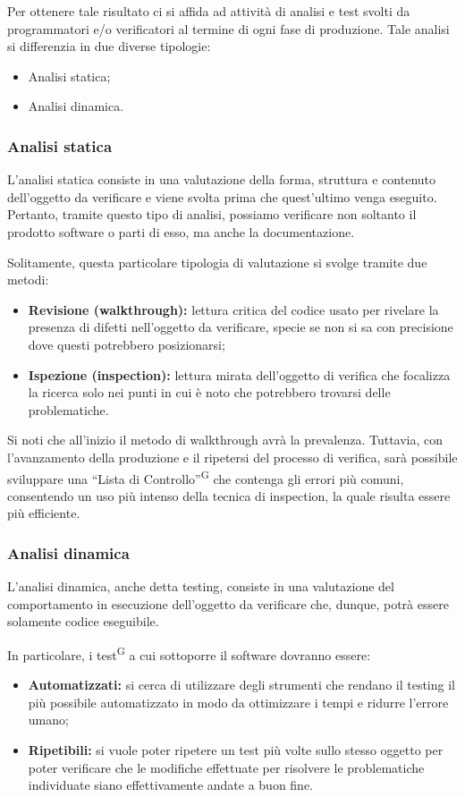 Per ottenere tale risultato ci si affida ad attività di analisi e test svolti da programmatori e/o verificatori al termine di ogni fase di produzione. Tale analisi si differenzia in due diverse tipologie:
\begin{itemize}
    \item Analisi statica;
    \item Analisi dinamica.
\end{itemize}

\subsubsection{Analisi statica}
L'analisi statica consiste in una valutazione della forma, struttura e contenuto dell'oggetto da verificare e viene svolta prima che quest'ultimo venga eseguito. Pertanto, tramite questo tipo di analisi, possiamo verificare non soltanto il prodotto software o parti di esso, ma anche la documentazione.

Solitamente, questa particolare tipologia di valutazione si svolge tramite due metodi:
\begin{itemize}
    \item \textbf{Revisione (walkthrough):} lettura critica del codice usato per rivelare la presenza di difetti nell'oggetto da verificare, specie se non si sa con precisione dove questi potrebbero posizionarsi;
    \item \textbf{Ispezione (inspection):} lettura mirata dell’oggetto di verifica che focalizza la ricerca solo nei punti in cui è noto che potrebbero trovarsi delle problematiche.
\end{itemize}
Si noti che all'inizio il metodo di walkthrough avrà la prevalenza. Tuttavia, con l'avanzamento della produzione e il ripetersi del processo di verifica, sarà possibile sviluppare una ``Lista di Controllo''\textsuperscript{G} che contenga gli errori più comuni, consentendo un uso più intenso della tecnica di inspection, la quale risulta essere più efficiente.

\subsubsection{Analisi dinamica}
L'analisi dinamica, anche detta testing, consiste in una valutazione del comportamento in esecuzione dell'oggetto da verificare che, dunque, potrà essere solamente codice eseguibile.

In particolare, i test\textsuperscript{G} a cui sottoporre il software dovranno essere:
\begin{itemize}
    \item \textbf{Automatizzati:} si cerca di utilizzare degli strumenti che rendano il testing il più possibile automatizzato in modo da ottimizzare i tempi e ridurre l'errore umano;
    \item \textbf{Ripetibili:} si vuole poter ripetere un test più volte sullo stesso oggetto per poter verificare che le modifiche effettuate per risolvere le problematiche individuate siano effettivamente andate a buon fine.
\end{itemize}

